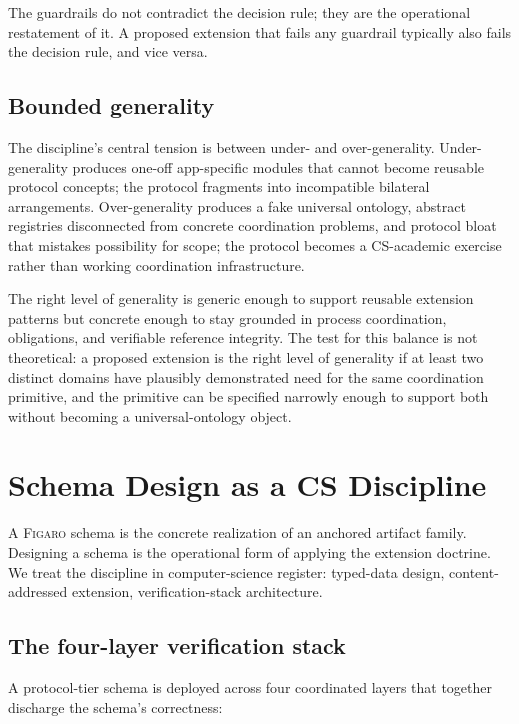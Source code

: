 \documentclass[11pt,a4paper]{article}
\theoremstyle{definition}
\theoremstyle{remark}
\newcommand{\figaro}{\textsc{Figaro}}
\begin{document}
The guardrails do not contradict the decision rule; they are the
operational restatement of it. A proposed extension that fails any
guardrail typically also fails the decision rule, and vice versa.

\subsection{Bounded generality}

The discipline's central tension is between under- and over-generality.
Under-generality produces one-off app-specific modules that cannot
become reusable protocol concepts; the protocol fragments into
incompatible bilateral arrangements. Over-generality produces a fake
universal ontology, abstract registries disconnected from concrete
coordination problems, and protocol bloat that mistakes possibility
for scope; the protocol becomes a CS-academic exercise rather than
working coordination infrastructure.

The right level of generality is generic enough to support reusable
extension patterns but concrete enough to stay grounded in process
coordination, obligations, and verifiable reference integrity. The
test for this balance is not theoretical: a proposed extension is
the right level of generality if at least two distinct domains have
plausibly demonstrated need for the same coordination primitive, and
the primitive can be specified narrowly enough to support both
without becoming a universal-ontology object.

\section{Schema Design as a CS Discipline}
\label{sec:schemas}

A \figaro{} schema is the concrete realization of an anchored
artifact family. Designing a schema is the operational form of
applying the extension doctrine. We treat the discipline in
computer-science register: typed-data design, content-addressed
extension, verification-stack architecture.

\subsection{The four-layer verification stack}

A protocol-tier schema is deployed across four coordinated layers
that together discharge the schema's correctness:
\end{document}
